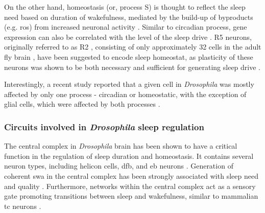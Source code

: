 \documentclass[../main.tex]{subfiles}
\begin{document}
On the other hand, homeostasis (or, process S) is thought to reflect the sleep need based on duration of wakefulness, mediated by the build-up of byproducts (e.g. \gls{ros}) from increased neuronal activity
\parencite{suarez-grimaltNeuralArchitectureSleep2021,doppSinglecellTranscriptomicsReveals2024,andreaniCircadianProgrammingEllipsoid2022,schmutzSpecificRoleREVERBaControlled2014}. Similar to circadian process, gene expression can also be correlated with the level of the sleep drive \parencite{liuSleepDriveEncoded2016}.
R5 neurons, originally referred to as R2 \parencite{shaferRegulationDrosophilaSleep2021,liuSleepDriveEncoded2016,donleaRecurrentCircuitryBalancing2018},
consisting of only approximately 32 cells in the adult fly brain \parencite{doppSinglecellTranscriptomicsReveals2024}, have been suggested to encode sleep homeostat, as plasticity of these neurons was shown to be both necessary and sufficient for generating sleep drive \parencite{liuSleepDriveEncoded2016,doppSinglecellTranscriptomicsReveals2024}.

Interestingly, a recent study reported that a given cell in \textit{Drosophila} was mostly affected by only one process - circadian or homeostatic, with the exception of glial cells, which were affected by both processes \parencite{doppSinglecellTranscriptomicsReveals2024}.


\subsubsection{Circuits involved in \textit{Drosophila} sleep regulation} \label{subsubsec:circuits_in_droso_sleep}

The central complex in \textit{Drosophila} brain has been shown to have a critical function in the regulation of sleep duration and homeostasis. It contains several neuron types, including helicon cells, \gls{dfb}, and \gls{eb} neurons \parencite{shaferRegulationDrosophilaSleep2021}.
Generation of coherent \gls{swa} in the central complex has been strongly associated with sleep need and quality \parencite{suarez-grimaltNeuralArchitectureSleep2021,raccugliaNetworkSpecificSynchronizationElectrical2019}.
Furthermore, networks within the central complex act as a sensory gate promoting transitions between sleep and wakefulness, similar to mammalian \gls{tc} neurons \parencite{raccugliaCoherentMultilevelNetwork2022,gentThalamicDualControl2018}.
\end{document}
